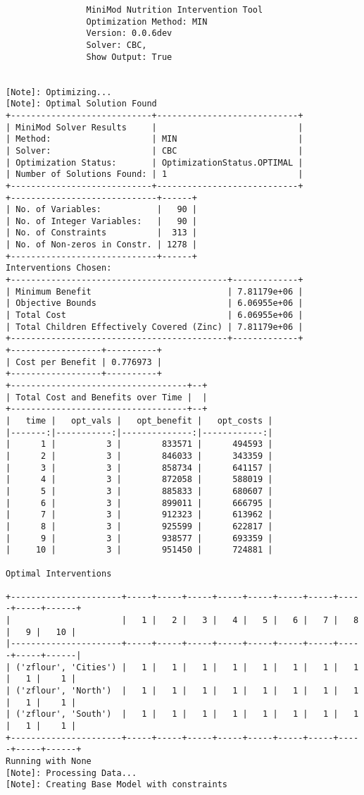\documentclass[
]{article}
\begin{document}
\begin{verbatim}
                MiniMod Nutrition Intervention Tool
                Optimization Method: MIN
                Version: 0.0.6dev
                Solver: CBC,
                Show Output: True
                
                
[Note]: Optimizing...
[Note]: Optimal Solution Found
+----------------------------+----------------------------+
| MiniMod Solver Results     |                            |
| Method:                    | MIN                        |
| Solver:                    | CBC                        |
| Optimization Status:       | OptimizationStatus.OPTIMAL |
| Number of Solutions Found: | 1                          |
+----------------------------+----------------------------+
+-----------------------------+------+
| No. of Variables:           |   90 |
| No. of Integer Variables:   |   90 |
| No. of Constraints          |  313 |
| No. of Non-zeros in Constr. | 1278 |
+-----------------------------+------+
Interventions Chosen:
+-------------------------------------------+-------------+
| Minimum Benefit                           | 7.81179e+06 |
| Objective Bounds                          | 6.06955e+06 |
| Total Cost                                | 6.06955e+06 |
| Total Children Effectively Covered (Zinc) | 7.81179e+06 |
+-------------------------------------------+-------------+
+------------------+----------+
| Cost per Benefit | 0.776973 |
+------------------+----------+
+-----------------------------------+--+
| Total Cost and Benefits over Time |  |
+-----------------------------------+--+
|   time |   opt_vals |   opt_benefit |   opt_costs |
|-------:|-----------:|--------------:|------------:|
|      1 |          3 |        833571 |      494593 |
|      2 |          3 |        846033 |      343359 |
|      3 |          3 |        858734 |      641157 |
|      4 |          3 |        872058 |      588019 |
|      5 |          3 |        885833 |      680607 |
|      6 |          3 |        899011 |      666795 |
|      7 |          3 |        912323 |      613962 |
|      8 |          3 |        925599 |      622817 |
|      9 |          3 |        938577 |      693359 |
|     10 |          3 |        951450 |      724881 |

Optimal Interventions

+----------------------+-----+-----+-----+-----+-----+-----+-----+-----+-----+------+
|                      |   1 |   2 |   3 |   4 |   5 |   6 |   7 |   8 |   9 |   10 |
|----------------------+-----+-----+-----+-----+-----+-----+-----+-----+-----+------|
| ('zflour', 'Cities') |   1 |   1 |   1 |   1 |   1 |   1 |   1 |   1 |   1 |    1 |
| ('zflour', 'North')  |   1 |   1 |   1 |   1 |   1 |   1 |   1 |   1 |   1 |    1 |
| ('zflour', 'South')  |   1 |   1 |   1 |   1 |   1 |   1 |   1 |   1 |   1 |    1 |
+----------------------+-----+-----+-----+-----+-----+-----+-----+-----+-----+------+
Running with None
[Note]: Processing Data...
[Note]: Creating Base Model with constraints


\end{verbatim}
\end{document}

